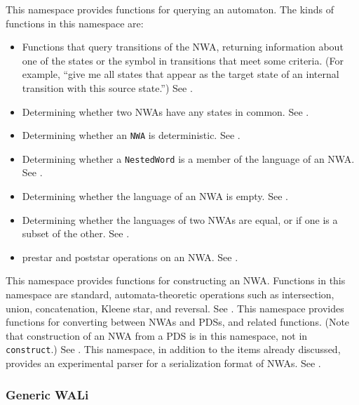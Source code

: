 \begin{functionlist}
   This namespace provides functions for
    querying an automaton. The kinds of functions in this namespace are:
    \begin{itemize}
      \item Functions that query transitions of
        the NWA, returning information about one of the states or the symbol
        in transitions that meet some criteria. (For example, ``give me all
        states that appear as the target state of an internal transition with
        this source state.'') See .
      \item Determining whether two NWAs have any states in
        common. See .
      \item Determining whether an \texttt{NWA} is deterministic. See
        .
      \item Determining whether a \texttt{NestedWord} is a member of the
        language of an NWA. See .
      \item Determining whether the language of an NWA is empty. See
        .
      \item Determining whether the languages of two NWAs are equal, or if
        one is a subset of the other. See .
      \item prestar and poststar operations on an NWA. See
        .
    \end{itemize}
    
   This namespace provides functions for
    constructing an NWA. Functions in this namespace are standard,
    automata-theoretic operations such as intersection, union, concatenation,
    Kleene star, and reversal. See .
   This namespace provides functions for
    converting between NWAs and PDSs, and related functions. (Note that
    construction of an NWA from a PDS is in this namespace, not in
    \texttt{construct}.) See .
   This namespace, in addition to the items already
    discussed, provides an experimental parser for a serialization format of
    NWAs. See .
\end{functionlist}


\subsubsection{Generic WALi}

